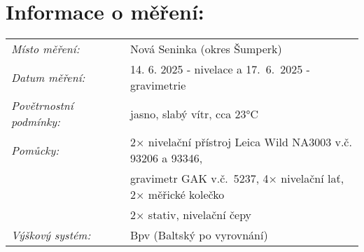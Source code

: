 \section{Informace o měření:}
\begin{tabular}{lll} 
\textit{Místo měření:} & & Nová Seninka (okres Šumperk)\\ 
\textit{Datum měření:} & & 14. 6. 2025 - nivelace a 17.~6.~2025 - gravimetrie\\
\textit{Povětrnostní podmínky:} & & jasno, slabý vítr, cca 23°C\\ 
\textit{Pomůcky:} & & 2× nivelační přístroj Leica Wild NA3003 v.č. 93206 a 93346,\\ 
& & gravimetr GAK v.č.~5237, 4× nivelační lať, 2× měřické kolečko\\
& & 2× stativ, nivelační čepy\\ 
\textit{Výškový systém:} & & Bpv (Baltský po vyrovnání)\\ 
\end{tabular}
